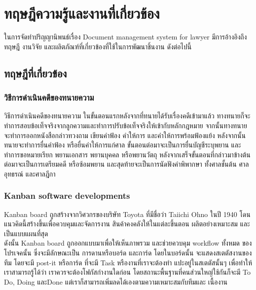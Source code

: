 \documentclass[12pt,oneside,openright,a4paper]{cpe-thai-project}
\begin{document}
\chapter{ทฤษฎีความรู้และงานที่เกี่ยวข้อง}

\hspace*{1cm}ในการจัดทําปริญญานิพนธ์เรื่อง Document management system for lawyer มีการอ้างอิงถึงทฤษฎี งานวิจัย และผลิตภัณฑ์ที่เกี่ยวข้องที่ใช้ในการพัฒนาชิ้นงาน ดังต่อไปนี้

\section{ทฤษฎีที่เกี่ยวข้อง}

\subsection{วิธีการดำเนินคดีของทนายความ} 
\hspace*{1cm}วิธีการดำเนินคดีของทนายความ \cite{LawyerDefinition, StepOfLawyer} ในขั้นตอนแรกหลังจากที่ทนายได้รับเรื่องคดีเข้ามาแล้ว ทางทนายก็จะทำการสอบข้อเท็จจริงจากลูกความและทำการปรับข้อเท็จจริงให้เข้ากับหลักกฎหมาย จากนั้นทางทนายจะทำการออกหนังสือกล่าวทวงถาม เขียนคำฟ้อง คำให้การ และคำให้การพร้อมฟ้องแย้ง หลังจากนั้นทนายจะทำการยื่นคำฟ้อง หรือยื่นคำให้การแก่ศาล ขั้นตอนต่อมาจะเป็นการยื่นบัญชีระบุพยาน และทำการขอหมายเรียก พยานเอกสาร พยานบุคคล หรือพยานวัตถุ หลังจากเสร็จขั้นตอนที่กล่าวมาข้างต้นต่อมาจะเป็นการเตรียมคดี หรือซ้อมพยาน และสุดท้ายจะเป็นการนัดฟังคำพิพากษา ทั้งศาลชั้นต้น ศาลอุทธรณ์ และศาลฎีกา 


\subsection{Kanban software developments} 
\hspace*{1cm}Kanban board \cite{WhatIsKanban, KanbanConcept} ถูกสร้างจากวิศวกรของบริษัท Toyota ที่มีชื่อว่า Taiichi Ohno ในปี 1940 โดนแนวคิดนี้สร้างขึ้นเพื่อควบคุมและจัดการงาน สินค้าคงคลังให้ในแต่ละขึ้นตอน ผลิตอย่างเหมาะสม และเป็นแบบแผนที่สุด\\
\hspace*{1cm}ดังนั้น Kanban board ถูกออกแบบมาเพื่อให้เห็นภาพรวม และช่วยควบคุม workflow ทั้งหมด ของโปรเจคนั้น ซึ่งจะมีลักษณะเป็น การดานหรือบอร์ด และการ์ด โดยในบอร์ดนั้น จะแสดงสเตตัสงานของทีม โดยจะมี post-it หรือการ์ด ที่จะมี Task หรืองานที่เราจะต้องทำ แปะอยู่ในสเตตัสนั้นๆ เพื่อทำให้เราสามารถรู้ได้ว่า เราควรจะต้องโฟกัสกำงานใดก่อน โดยสถานะพื้นฐานที่คนส่วนใหญ่ใช้กันก็จะมี To Do, Doing และDone แต่เราก็สามารถเพิ่มลดได้เองตามความเหมาะสมกับทีมและ เนื้องาน
\end{document}
